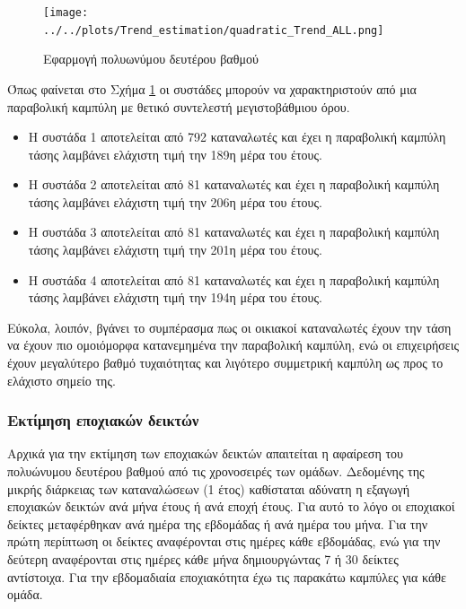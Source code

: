 \begin{figure}[ht!]
\centering
\texttt{[image: ../../plots/Trend\_estimation/quadratic\_Trend\_ALL.png]}
\caption{Εφαρμογή πολυωνύμου δευτέρου  βαθμού}
\label{fig:quadratic trend}
\end{figure}


Όπως φαίνεται στο Σχήμα \ref{fig:quadratic trend} οι συστάδες μπορούν να χαρακτηριστούν από μια παραβολική καμπύλη με θετικό συντελεστή μεγιστοβάθμιου όρου.
\begin{itemize}
\item Η συστάδα 1 αποτελείται από 792 καταναλωτές και έχει η παραβολική καμπύλη τάσης λαμβάνει ελάχιστη τιμή την 189η μέρα του έτους.
\item Η συστάδα 2 αποτελείται από 81 καταναλωτές και έχει η παραβολική καμπύλη τάσης λαμβάνει ελάχιστη τιμή την 206η μέρα του έτους. 
\item Η συστάδα 3 αποτελείται από 81 καταναλωτές και έχει η παραβολική καμπύλη τάσης λαμβάνει ελάχιστη τιμή την 201η μέρα του έτους.
\item Η συστάδα 4 αποτελείται από 81 καταναλωτές και έχει η παραβολική καμπύλη τάσης λαμβάνει ελάχιστη τιμή την 194η μέρα του έτους.
\end{itemize}

Εύκολα, λοιπόν, βγάνει το συμπέρασμα πως οι οικιακοί καταναλωτές έχουν την τάση να έχουν πιο ομοιόμορφα κατανεμημένα την παραβολική καμπύλη, ενώ οι επιχειρήσεις έχουν μεγαλύτερο βαθμό τυχαιότητας και λιγότερο συμμετρική καμπύλη ως προς το ελάχιστο σημείο της.
\subsubsection{Εκτίμηση εποχιακών δεικτών}
Αρχικά για την εκτίμηση των εποχιακών δεικτών απαιτείται η αφαίρεση του πολυώνυμου δευτέρου βαθμού από τις χρονοσειρές των ομάδων.\cite{timeseriesanalysis} Δεδομένης της μικρής διάρκειας των καταναλώσεων (1 έτος) καθίσταται αδύνατη η εξαγωγή εποχιακών δεικτών ανά μήνα έτους ή ανά εποχή έτους. Για αυτό το λόγο οι εποχιακοί δείκτες μεταφέρθηκαν ανά ημέρα της εβδομάδας ή ανά ημέρα του μήνα. Για την πρώτη περίπτωση οι δείκτες αναφέρονται στις ημέρες κάθε εβδομάδας, ενώ για την δεύτερη αναφέρονται στις ημέρες κάθε μήνα δημιουργώντας 7 ή 30 δείκτες αντίστοιχα. Για την εβδομαδιαία εποχιακότητα έχω τις παρακάτω καμπύλες για κάθε ομάδα.
